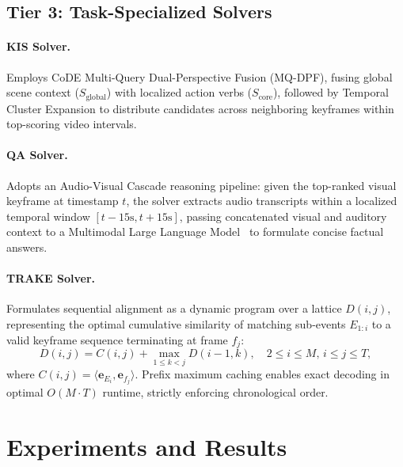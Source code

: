 \documentclass[runningheads]{llncs}
\begin{document}
\subsection{Tier 3: Task-Specialized Solvers}
\paragraph{KIS Solver.} Employs CoDE Multi-Query Dual-Perspective Fusion (MQ-DPF), fusing global scene context ($S_{\text{global}}$) with localized action verbs ($S_{\text{core}}$), followed by Temporal Cluster Expansion to distribute candidates across neighboring keyframes within top-scoring video intervals.

\paragraph{QA Solver.} Adopts an Audio-Visual Cascade reasoning pipeline: given the top-ranked visual keyframe at timestamp $t$, the solver extracts audio transcripts within a localized temporal window $[t - 15\text{s}, t + 15\text{s}]$, passing concatenated visual and auditory context to a Multimodal Large Language Model~\cite{geminiteam2024gemini} to formulate concise factual answers.

\paragraph{TRAKE Solver.} Formulates sequential alignment as a dynamic program over a lattice $D(i, j)$, representing the optimal cumulative similarity of matching sub-events $E_{1:i}$ to a valid keyframe sequence terminating at frame $f_j$:
\begin{equation}
    D(i, j) = C(i, j) + \max_{1 \le k < j} D(i-1, k), \quad 2 \le i \le M, \, i \le j \le T,
\end{equation}
where $C(i, j) = \langle \mathbf{e}_{E_i}, \mathbf{e}_{f_j} \rangle$. Prefix maximum caching enables exact decoding in optimal $O(M \cdot T)$ runtime, strictly enforcing chronological order.

%
%
\section{Experiments and Results}
\label{sec:experiments}
\end{document}
